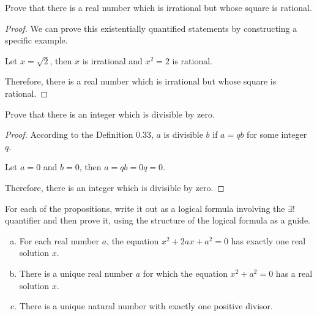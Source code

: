 \begin{exercise}
Prove that there is a real number which is irrational but whose square is rational.
\end{exercise}

\begin{solutions*}
    \fixlistskip
    \begin{proof}
        We can prove this existentially quantified statements by constructing a specific example.

        Let $x = \sqrt{2}$, then $x$ is irrational and $x^2 = 2$ is rational.

        Therefore, there is a real number which is irrational but whose square is rational.
    \end{proof}
\end{solutions*}

\begin{exercise}
Prove that there is an integer which is divisible by zero.
\end{exercise}

\begin{solutions*}
    \fixlistskip
    \begin{proof}
        According to the Definition 0.33, $a$ is divisible $b$ if $a = qb$ for some integer $q$.

        Let $a = 0$ and $b = 0$, then $a = qb = 0q = 0$.

        Therefore, there is an integer which is divisible by zero.
    \end{proof}
\end{solutions*}

\begin{exercise}
\label{exExamplesOfUniqueExistentialQuantifier}
For each of the propositions, write it out as a logical formula involving the $\exists !$ quantifier and then prove it, using the structure of the logical formula as a guide.
\begin{enumerate}[(a)]
\item For each real number $a$, the equation $x^2+2ax+a^2=0$ has exactly one real solution $x$.
\item There is a unique real number $a$ for which the equation $x^2+a^2=0$ has a real solution $x$.
\item There is a unique natural number with exactly one positive divisor.
\end{enumerate}
\end{exercise}

